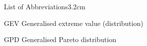 \begin{mclistof}{List of Abbreviations}{3.2cm} %

\item[GEV] Generalised extreme value (distribution)

\item[GPD] Generalised Pareto distribution

\end{mclistof}